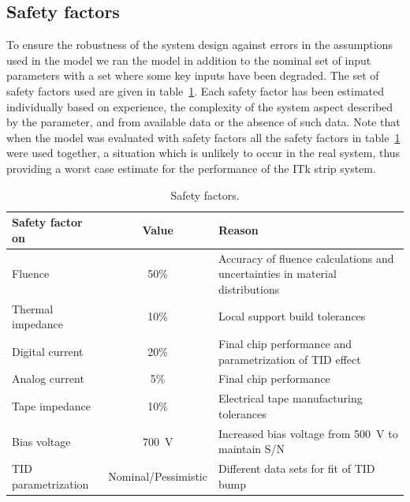 \subsection{Safety factors}
\label{sec:safety_factors}
To ensure the robustness of the system design against errors in the assumptions used in the model we ran the model in addition to the nominal set of input parameters with a set where some key inputs have been degraded. The set of safety factors used are given in table~\ref{tab:safetyfactors}. Each safety factor has been estimated individually based on experience, the complexity of the system aspect described by the parameter, and from available data or the absence of such data. Note that when the model was evaluated with safety factors all the safety factors in table~\ref{tab:safetyfactors} were used together, a situation which is unlikely to occur in the real system, thus providing a worst case estimate for the performance of the ITk strip system.

\begin{table}[htb]
\caption{Safety factors.}
\label{tab:safetyfactors}
\centering
\begin{tabular}{lcl}
Safety factor on & Value & Reason \\
\hline
Fluence  & 50\% & Accuracy of fluence calculations and uncertainties in material distributions\\
Thermal impedance & 10\% & Local support build tolerances\\
Digital current & 20\% & Final chip performance and parametrization of TID effect\\
Analog current & 5\% & Final chip performance\\
Tape impedance & 10\% & Electrical tape manufacturing tolerances\\
Bias voltage & 700~V & Increased bias voltage from 500~V to maintain S/N\\
TID parametrization & Nominal/Pessimistic & Different data sets for fit of TID bump\\
\end{tabular}
\end{table}

